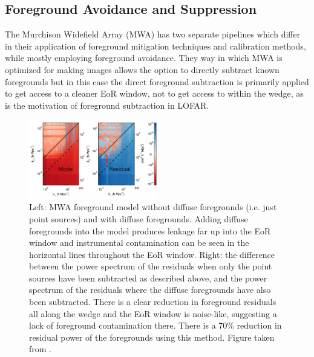 \subsection{Foreground Avoidance and Suppression}

The Murchison Widefield Array (MWA) has two separate pipelines which differ in their application of foreground mitigation techniques and calibration methods, while mostly employing foreground avoidance. They way in which MWA is optimized for making images allows the option to directly subtract known foregrounds but in this case the direct foreground subtraction is primarily applied to get access to a cleaner EoR window, not to get access to within the wedge, as is the motivation of foreground subtraction in LOFAR.

\begin{figure}
\begin{center}
    \includegraphics[width=0.5\textwidth]{Images/apjaa3b64f9_hr.png}
\end{center}
\caption{Left: MWA foreground model without diffuse foregrounds (i.e. just point sources) and with diffuse foregrounds. Adding diffuse foregrounds into the model produces leakage far up into the EoR window and instrumental contamination can be seen in the horizontal lines throughout the EoR window. Right: the difference between the power spectrum of the residuals when only the point sources have been subtracted as described above, and the power spectrum of the residuals where the diffuse foregrounds have also been subtracted. There is a clear reduction in foreground residuals all along the wedge and the EoR window is noise-like, suggesting a lack of foreground contamination there. There is a 70$\%$ reduction in residual power of the foregrounds using this method. Figure taken from \citet{Beardsley2016ApJ...833..102B}.}
    \label{fig:beardsley_fg_sub}
\end{figure}

